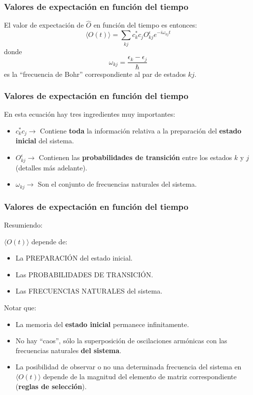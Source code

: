 \documentclass{beamer}
\begin{document}
\begin{frame}
    \frametitle{Valores de expectación en función del tiempo}
     El valor de expectación de $\hat{O}$ en función del tiempo es entonces:
    $$\langle O(t)\rangle =\sum_{kj} c_k^* c_j O^\epsilon_{kj}e^{-i \omega_{kj} t}$$
    donde
    $$ \omega_{kj} = \frac{\epsilon_k - \epsilon_j}{\hbar}$$
    es la ``frecuencia de Bohr'' correspondiente al par de estados $kj$.
\end{frame}

\begin{frame}
    \frametitle{Valores de expectación en función del tiempo}
    En esta ecuación hay tres ingredientes muy importantes:
    \begin{itemize}
        \item $c_k^* c_j \rightarrow$ Contiene {\bf toda} la información relativa a la preparación del {\bf estado inicial} del sistema.
        \item $O^\epsilon_{kj} \rightarrow$ Contienen las {\bf probabilidades de transición} entre los estados $k$ y $j$ (detalles más adelante).
        \item $\omega_{kj} \rightarrow$ Son el conjunto de frecuencias naturales del sistema.
    \end{itemize}
\end{frame}

\begin{frame}
    \frametitle{Valores de expectación en función del tiempo}
    Resumiendo:
    \begin{block}{$\langle O(t) \rangle$ depende de:}
        \begin{itemize}
            \item La PREPARACIÓN del estado inicial.
            \item Las PROBABILIDADES DE TRANSICIÓN.
            \item Las FRECUENCIAS NATURALES del sistema.
        \end{itemize}
    \end{block}
    \begin{block}{Notar que:}
        \begin{itemize}
            \item La memoria del {\bf estado inicial} permanece infinitamente.
            \item No hay ``caos'', sólo la superposición de oscilaciones armónicas con las frecuencias naturales {\bf del sistema}.
            \item La posibilidad de observar o no una determinada frecuencia del sistema en $\langle O(t) \rangle$ depende de la magnitud del elemento de matriz correspondiente ({\bf reglas de selección}).
        \end{itemize}
    \end{block}

\end{frame}
\end{document}
